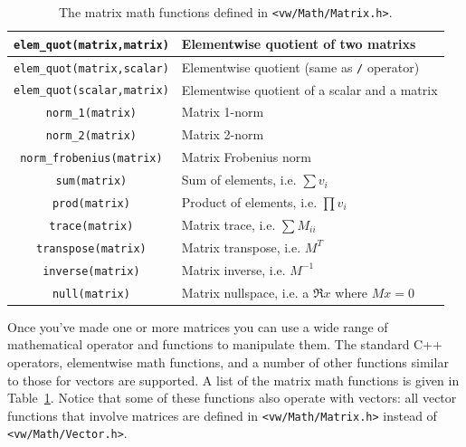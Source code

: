 \begin{table}[t!]
\begin{centering}
\begin{tabular}{|c|l|}
\verb#elem_quot(matrix,matrix)# & Elementwise quotient of two matrixs \\ \hline
\verb#elem_quot(matrix,scalar)# & Elementwise quotient (same as \verb#/# operator) \\ \hline
\verb#elem_quot(scalar,matrix)# & Elementwise quotient of a scalar and a matrix \\ \hline
\hline
\verb#norm_1(matrix)# & Matrix 1-norm \\ \hline
\verb#norm_2(matrix)# & Matrix 2-norm \\ \hline
\verb#norm_frobenius(matrix)# & Matrix Frobenius norm \\ \hline
\verb#sum(matrix)# & Sum of elements, i.e. $\sum v_i$ \\ \hline
\verb#prod(matrix)# & Product of elements, i.e. $\prod v_i$ \\ \hline
\verb#trace(matrix)# & Matrix trace, i.e. $\sum M_{ii}$ \\ \hline
\verb#transpose(matrix)# & Matrix transpose, i.e. $M^T$ \\ \hline
\verb#inverse(matrix)# & Matrix inverse, i.e. $M^{-1}$ \\ \hline
\verb#null(matrix)# & Matrix nullspace, i.e. a $\Re x$ where  $Mx=0$ \\ \hline
\end{tabular}
\caption{The matrix math functions defined in {\tt <vw/Math/Matrix.h>}.}
\label{tbl:matrix-functions}
\end{centering}\end{table}

Once you've made one or more matrices you can use a wide range of 
mathematical operator and functions to manipulate them.  The 
standard C++ operators, elementwise math functions, and a number 
of other functions similar to those for vectors are supported.  A 
list of the matrix math functions is given in Table~\ref{tbl:matrix-functions}.
Notice that some of these functions also operate with vectors: 
all vector functions that involve matrices are defined in 
\verb#<vw/Math/Matrix.h># instead of \verb#<vw/Math/Vector.h>#.

